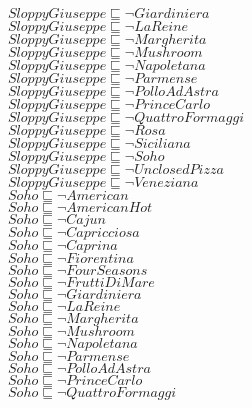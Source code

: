\documentclass[a4paper,10pt]{article}
\begin{document}
 $SloppyGiuseppe \sqsubseteq  \lnot Giardiniera$\\ 
 $SloppyGiuseppe \sqsubseteq  \lnot LaReine$\\ 
 $SloppyGiuseppe \sqsubseteq  \lnot Margherita$\\ 
 $SloppyGiuseppe \sqsubseteq  \lnot Mushroom$\\ 
 $SloppyGiuseppe \sqsubseteq  \lnot Napoletana$\\ 
 $SloppyGiuseppe \sqsubseteq  \lnot Parmense$\\ 
 $SloppyGiuseppe \sqsubseteq  \lnot PolloAdAstra$\\ 
 $SloppyGiuseppe \sqsubseteq  \lnot PrinceCarlo$\\ 
 $SloppyGiuseppe \sqsubseteq  \lnot QuattroFormaggi$\\ 
 $SloppyGiuseppe \sqsubseteq  \lnot Rosa$\\ 
 $SloppyGiuseppe \sqsubseteq  \lnot Siciliana$\\ 
 $SloppyGiuseppe \sqsubseteq  \lnot Soho$\\ 
 $SloppyGiuseppe \sqsubseteq  \lnot UnclosedPizza$\\ 
 $SloppyGiuseppe \sqsubseteq  \lnot Veneziana$\\ 
 $Soho \sqsubseteq  \lnot American$\\ 
 $Soho \sqsubseteq  \lnot AmericanHot$\\ 
 $Soho \sqsubseteq  \lnot Cajun$\\ 
 $Soho \sqsubseteq  \lnot Capricciosa$\\ 
 $Soho \sqsubseteq  \lnot Caprina$\\ 
 $Soho \sqsubseteq  \lnot Fiorentina$\\ 
 $Soho \sqsubseteq  \lnot FourSeasons$\\ 
 $Soho \sqsubseteq  \lnot FruttiDiMare$\\ 
 $Soho \sqsubseteq  \lnot Giardiniera$\\ 
 $Soho \sqsubseteq  \lnot LaReine$\\ 
 $Soho \sqsubseteq  \lnot Margherita$\\ 
 $Soho \sqsubseteq  \lnot Mushroom$\\ 
 $Soho \sqsubseteq  \lnot Napoletana$\\ 
 $Soho \sqsubseteq  \lnot Parmense$\\ 
 $Soho \sqsubseteq  \lnot PolloAdAstra$\\ 
 $Soho \sqsubseteq  \lnot PrinceCarlo$\\ 
 $Soho \sqsubseteq  \lnot QuattroFormaggi$\\ 
\end{document}
